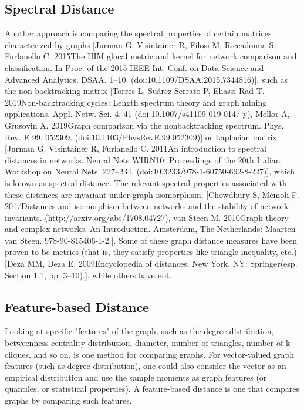 \subsection{Spectral Distance}
Another approach is comparing the spectral properties of certain matrices characterized by graphs [Jurman G, Visintainer R, Filosi M, Riccadonna S, Furlanello C. 2015The HIM glocal metric and kernel for network comparison and classification. In Proc. of the 2015 IEEE Int. Conf. on Data Science and Advanced Analytics, DSAA. 1–10. (doi:10.1109/DSAA.2015.7344816)], such as the non-backtracking matrix [Torres L, Suárez-Serrato P, Eliassi-Rad T. 2019Non-backtracking cycles: Length spectrum theory and graph mining applications. Appl. Netw. Sci. 4, 41 (doi:10.1007/s41109-019-0147-y), Mellor A, Grusovin A. 2019Graph comparison via the nonbacktracking spectrum. Phys. Rev. E 99, 052309. (doi:10.1103/PhysRevE.99.052309)] or Laplacian matrix [Jurman G, Visintainer R, Furlanello C. 2011An introduction to spectral distances in networks. Neural Nets WIRN10: Proceedings of the 20th Italian Workshop on Neural Nets. 227–234. (doi:10.3233/978-1-60750-692-8-227)], which is known as spectral distance. The relevant spectral properties associated with these distances are invariant under graph isomorphism. [Chowdhury S, Mémoli F. 2017Distances and isomorphism between networks and the stability of network invariants. (http://arxiv.org/abs/1708.04727), van Steen M. 2010Graph theory and complex networks. An Introduction. Amsterdam, The Netherlands: Maarten van Steen. 978-90-815406-1-2.]. Some of these graph distance measures have been proven to be metrics (that is, they satisfy properties like triangle inequality, etc.) [Deza MM, Deza E. 2009Encyclopedia of distances. New York, NY: Springer(esp. Section 1.1, pp. 3–10).], while others have not.

\subsection{Feature-based Distance}
Looking at specific "features" of the graph, such as the degree distribution, betweenness centrality distribution, diameter, number of triangles, number of k-cliques, and so on, is one method for comparing graphs. For vector-valued graph features (such as degree distribution), one could also consider the vector as an empirical distribution and use the sample moments as graph features (or quantiles, or statistical properties). A feature-based distance is one that compares graphs by comparing such features.

